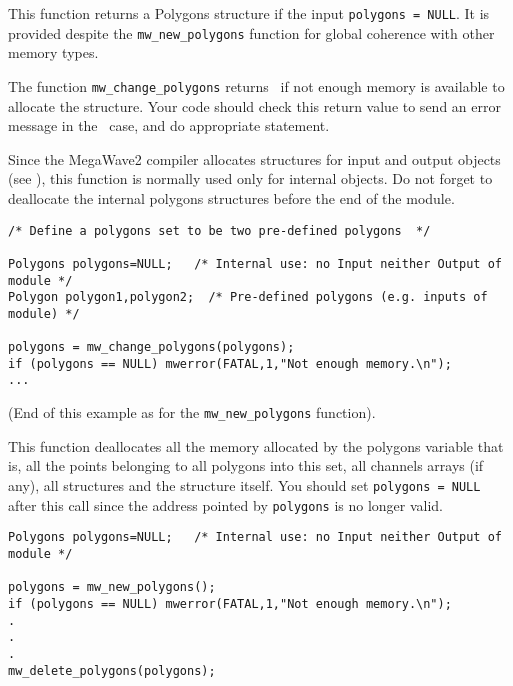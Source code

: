 \Description
This function returns a Polygons structure if the input \verb+polygons = NULL+.
It is provided despite the \verb+mw_new_polygons+ function for
global coherence with other memory types.

The function \verb+mw_change_polygons+ returns \Null\ if not enough memory is available to allocate the structure. 
Your code should check this return value to send an error message in the \Null\ case, and do appropriate statement.

Since the MegaWave2 compiler allocates structures for input and output 
objects (see \volI), this function is normally used only for internal objects.
Do not forget to deallocate the internal polygons structures before the end
of the module.

\Next
\Example
\begin{verbatim}
/* Define a polygons set to be two pre-defined polygons  */

Polygons polygons=NULL;   /* Internal use: no Input neither Output of module */
Polygon polygon1,polygon2;  /* Pre-defined polygons (e.g. inputs of module) */

polygons = mw_change_polygons(polygons);
if (polygons == NULL) mwerror(FATAL,1,"Not enough memory.\n");
...
\end{verbatim}
(End of this example as for the \verb+mw_new_polygons+ function).


\newpage %


\Description
This function deallocates all the memory allocated by the polygons variable
that is, all the points belonging to all polygons into this set, all channels arrays (if any), all \polygon structures and the \polygons structure itself.
You should set \verb+polygons = NULL+ after this call since the address pointed
by \verb+polygons+ is no longer valid.

\Next
\Example
\begin{verbatim}
Polygons polygons=NULL;   /* Internal use: no Input neither Output of module */

polygons = mw_new_polygons();
if (polygons == NULL) mwerror(FATAL,1,"Not enough memory.\n");
.
.
.
mw_delete_polygons(polygons);
\end{verbatim}

